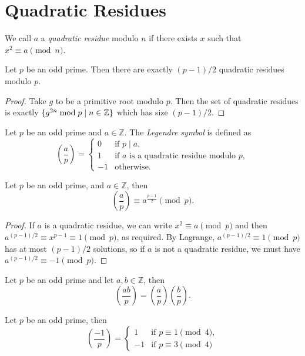 \documentclass[a4paper, 10pt]{amsart}
\begin{document}
\section{Quadratic Residues}

\begin{definition}
We call $a$ a \emph{quadratic residue} modulo $n$ if there exists $x$ such that $x^2 \equiv a \pmod{n}$.
\end{definition}

\begin{lemma}
  Let $p$ be an odd prime. Then there are exactly $(p-1)/2$ quadratic residues modulo $p$.
\end{lemma}
\begin{proof}
  Take $g$ to be a primitive root modulo $p$. Then the set of quadratic residues is exactly $\{g^{2n} \bmod p \mid n \in \mathbb{Z}\}$ which has size $(p-1)/2$.
\end{proof}

\begin{definition}
Let $p$ be an odd prime and $a \in \mathbb{Z}$. The \emph{Legendre symbol} is defined as
  $$
  \left(\frac{a}{p}\right)=\begin{cases}
    0 & \text{if } p \mid a, \\
  1 & \text{if } a \text { is a quadratic residue modulo } p, \\
  -1 & \text{otherwise}.
   \end{cases}
  $$
\end{definition}

\begin{theorem}
  Let $p$ be an odd prime, and $a \in \mathbb{Z}$, then
  $$
  \left(\frac{a}{p}\right) \equiv a^{\frac{p-1}{2}} \pmod{p}.
  $$
\end{theorem}
\begin{proof}
    If $a$ is a quadratic residue, we can write $x^2 \equiv a \pmod{p}$ and then $a^{(p-1)/2}\equiv x^{p-1} \equiv 1\pmod{p}$, as required. 
    By Lagrange, $a^{(p-1)/2} \equiv 1 \pmod{p}$ has at most $(p-1)/2$ solutions, so if $a$ is not a quadratic residue, we must have $a^{(p-1)/2} \equiv -1 \pmod{p}$. 
\end{proof}

\begin{corollary}
  Let $p$ be an odd prime and let $a, b \in \mathbb{Z}$, then
$$
\left(\frac{a b}{p}\right)=\left(\frac{a}{p}\right)\left(\frac{b}{p}\right).
$$
\end{corollary}
\begin{corollary}
  Let $p$ be an odd prime, then
  $$
  \left(\frac{-1}{p}\right)=\begin{cases}
    1 & \text{if } p \equiv 1 \pmod{4}, \\
  -1 & \text{if } p \equiv 3 \pmod{4}
   \end{cases}
  $$
\end{corollary}
\end{document}
